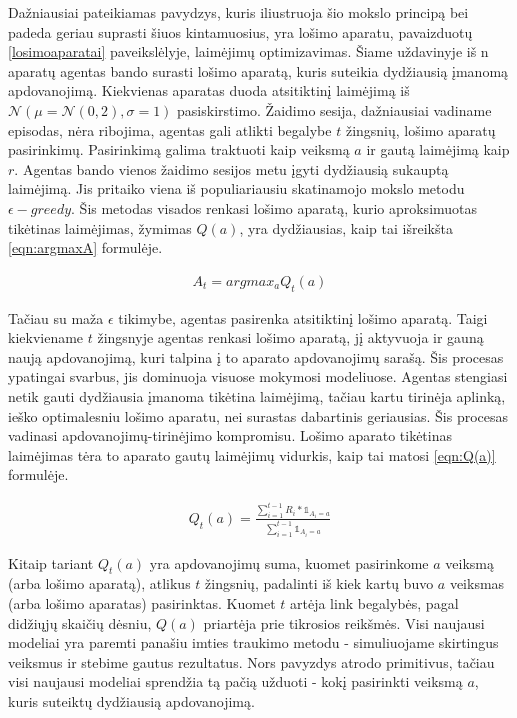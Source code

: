 \documentclass[a4paper, 12pt]{article}
\begin{document}
Dažniausiai pateikiamas pavydzys, kuris iliustruoja šio mokslo principą bei padeda geriau suprasti šiuos kintamuosius, yra lošimo aparatu, pavaizduotų \ref{losimoaparatai} paveikslėlyje, laimėjimų optimizavimas. Šiame uždavinyje iš n aparatų agentas bando surasti lošimo aparatą, kuris suteikia dydžiausią įmanomą apdovanojimą. Kiekvienas aparatas duoda atsitiktinį laimėjimą iš  $\mathcal{N}(\mu=\mathcal{N}(0,2),\sigma=1)$ pasiskirstimo. Žaidimo sesija, dažniausiai vadiname episodas, nėra ribojima, agentas gali atlikti begalybe $t$ žingsnių, lošimo aparatų pasirinkimų. Pasirinkimą galima traktuoti kaip veiksmą $a$ ir gautą laimėjimą kaip $r$. Agentas bando vienos žaidimo sesijos metu įgyti dydžiausią sukauptą laimėjimą. Jis pritaiko viena iš populiariausiu skatinamojo mokslo metodu $\epsilon-greedy$. Šis metodas visados renkasi lošimo aparatą, kurio aproksimuotas tikėtinas laimėjimas, žymimas $Q(a)$, yra dydžiausias, kaip tai išreikšta \ref {eqn:argmaxA} formulėje.

\begin{equation}
\label{eqn:argmaxA}
\begin{gathered}
A_t = argmax_aQ_t(a)
\end{gathered}
\end{equation}

Tačiau su maža $\epsilon$ tikimybe, agentas pasirenka atsitiktinį lošimo aparatą. Taigi kiekviename $t$ žingsnyje agentas renkasi lošimo aparatą, jį aktyvuoja ir gauną naują apdovanojimą, kuri talpina į to aparato apdovanojimų sarašą. Šis procesas ypatingai svarbus, jis dominuoja visuose mokymosi modeliuose. Agentas stengiasi netik gauti dydžiausia įmanoma tikėtina laimėjimą, tačiau kartu tirinėja aplinką, ieško optimalesniu lošimo aparatu, nei surastas dabartinis geriausias. Šis procesas vadinasi apdovanojimų-tirinėjimo kompromisu. Lošimo aparato tikėtinas laimėjimas tėra to aparato gautų laimėjimų vidurkis, kaip tai matosi \ref{eqn:Q(a)} formulėje.

\begin{equation}
\label{eqn:Q(a)}
\begin{gathered}
Q_t(a) = \frac{\sum_{i=1}^{t-1}R_i*\mathbb{1}_{A_i=a}} {\sum_{i=1}^{t-1}\mathbb{1}_{A_i=a}}
\end{gathered}
\end{equation}

Kitaip tariant $Q_t(a)$ yra apdovanojimų suma, kuomet pasirinkome $a$ veiksmą (arba lošimo aparatą), atlikus $t$ žingsnių, padalinti iš kiek kartų buvo $a$ veiksmas (arba lošimo aparatas) pasirinktas. Kuomet $t$ artėja link begalybės, pagal didžiųjų skaičių dėsniu, $Q(a)$ priartėja prie tikrosios reikšmės. Visi naujausi modeliai yra paremti panašiu imties traukimo metodu - simuliuojame skirtingus veiksmus ir stebime gautus rezultatus. Nors pavyzdys atrodo primitivus, tačiau visi naujausi modeliai sprendžia tą pačią užduoti - kokį pasirinkti veiksmą $a$, kuris suteiktų dydžiausią apdovanojimą. 
\end{document}

